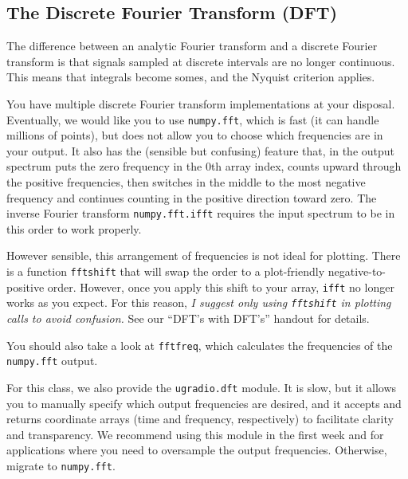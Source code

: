 \documentclass[11pt,preprint]{aastex}
\begin{document}
\subsection{The Discrete Fourier Transform (DFT)} \label{dft}

\noindent
The difference between an analytic Fourier transform and a discrete Fourier transform is
that signals sampled at discrete intervals are no longer continuous. This means that
integrals become somes, and the Nyquist criterion applies.

You have multiple discrete Fourier transform implementations at your disposal.  Eventually, we would like you
to use \verb$numpy.fft$, which is fast (it can handle millions of points), but does not allow you to choose
which frequencies are in your output. It also has the (sensible but confusing) feature that, in the output
spectrum puts the zero frequency in the 0th array index, counts upward through the positive frequencies, then
switches in the middle to the most negative frequency and continues counting in the positive direction
toward zero.  The inverse Fourier transform \verb$numpy.fft.ifft$ requires the input spectrum to be in this
order to work properly.

However sensible, this arrangement of frequencies is not ideal for plotting. There is a function \verb$fftshift$
that will swap the order to a plot-friendly negative-to-positive order. However, once you apply this shift to
your array, \verb$ifft$ no longer works as you expect.  For this reason, {\it I suggest only using 
\verb$fftshift$ in plotting calls to avoid confusion.}
See our ``DFT's with DFT's'' handout for details.

You should also take a look at \verb$fftfreq$, which calculates the frequencies of the \verb$numpy.fft$ output.

For this class, we also provide the \verb$ugradio.dft$ module.  It is slow, but it allows you to manually specify
which output frequencies are desired, and it accepts and returns coordinate arrays (time and frequency, respectively)
to facilitate clarity and transparency. We recommend using this module in the first week and for applications where
you need to oversample the output frequencies. Otherwise, migrate to \verb$numpy.fft$.
\end{document}
